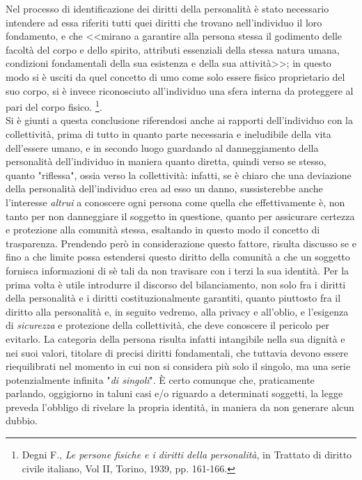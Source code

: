 Nel processo di identificazione dei diritti della personalità è stato necessario intendere ad essa riferiti tutti quei diritti che trovano nell'individuo il loro fondamento, e che <<mirano a garantire alla persona stessa il godimento delle facoltà del corpo e dello spirito, attributi essenziali della stessa natura umana, condizioni fondamentali della sua esistenza e della sua attività>>; in questo modo si è usciti da quel concetto di umo come solo essere fisico proprietario del suo corpo, si è invece riconosciuto all'individuo una sfera interna da proteggere al pari del corpo fisico.
\footnote{Degni F., \textit{Le persone fisiche e i diritti della personalità}, in Trattato di diritto civile italiano, Vol II, Torino, 1939, pp. 161-166.}.
\\Si è giunti a questa conclusione riferendosi anche ai rapporti dell'individuo con la collettività, prima di tutto in quanto parte necessaria e ineludibile della vita dell'essere umano, e in secondo luogo guardando al danneggiamento della personalità dell'individuo in maniera quanto diretta, quindi verso se stesso, quanto "riflessa", ossia verso la collettività: infatti, se è chiaro che una deviazione della personalità dell'individuo crea ad esso un danno, sussisterebbe anche l’interesse \textit{altrui} a conoscere ogni persona come quella che effettivamente è, non tanto per non danneggiare il soggetto in questione, quanto per assicurare certezza e protezione alla comunità stessa, esaltando in questo modo il concetto di trasparenza. Prendendo però in considerazione questo fattore, risulta discusso se e fino a che limite possa estendersi questo diritto della comunità a che un soggetto fornisca informazioni di sè tali da non travisare con i terzi la sua identità. Per la prima volta è utile introdurre il discorso del bilanciamento, non solo fra i diritti della personalità e i diritti costituzionalmente garantiti, quanto piuttosto fra il diritto alla personalità e, in seguito vedremo, alla privacy e all'oblio, e l'esigenza di \textit{sicurezza} e protezione della collettività, che deve conoscere il pericolo per evitarlo. La categoria della persona risulta infatti intangibile nella sua dignità e nei suoi valori, titolare di precisi diritti fondamentali, che tuttavia devono essere riequilibrati nel momento in cui non si considera più solo il singolo, ma una serie potenzialmente infinita "\textit{di singoli}".
È certo comunque che, praticamente parlando, oggigiorno in taluni casi e/o riguardo a determinati soggetti, la legge preveda l'obbligo di rivelare la propria identità, in maniera da non generare alcun dubbio.

